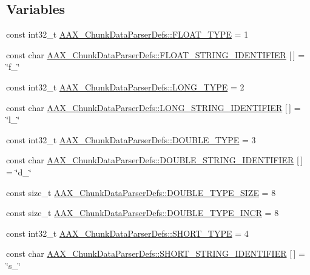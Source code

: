 \subsection*{Variables}
\begin{DoxyCompactItemize}
\item 
const int32\+\_\+t \mbox{\hyperlink{a00851_ad5dab97f040a4e216054bec18a3a3848}{A\+A\+X\+\_\+\+Chunk\+Data\+Parser\+Defs\+::\+F\+L\+O\+A\+T\+\_\+\+T\+Y\+PE}} = 1
\item 
const char \mbox{\hyperlink{a00851_a8340a22e9392091da5acf3bbbea18fc6}{A\+A\+X\+\_\+\+Chunk\+Data\+Parser\+Defs\+::\+F\+L\+O\+A\+T\+\_\+\+S\+T\+R\+I\+N\+G\+\_\+\+I\+D\+E\+N\+T\+I\+F\+I\+ER}} \mbox{[}$\,$\mbox{]} = \char`\"{}f\+\_\+\char`\"{}
\item 
const int32\+\_\+t \mbox{\hyperlink{a00851_a228099aae2d4442465b8d8ba67d832c7}{A\+A\+X\+\_\+\+Chunk\+Data\+Parser\+Defs\+::\+L\+O\+N\+G\+\_\+\+T\+Y\+PE}} = 2
\item 
const char \mbox{\hyperlink{a00851_af53f70a76b16ae3e06cd38515f3842e1}{A\+A\+X\+\_\+\+Chunk\+Data\+Parser\+Defs\+::\+L\+O\+N\+G\+\_\+\+S\+T\+R\+I\+N\+G\+\_\+\+I\+D\+E\+N\+T\+I\+F\+I\+ER}} \mbox{[}$\,$\mbox{]} = \char`\"{}l\+\_\+\char`\"{}
\item 
const int32\+\_\+t \mbox{\hyperlink{a00851_a4724cff14c9b5d97bf3304247c717763}{A\+A\+X\+\_\+\+Chunk\+Data\+Parser\+Defs\+::\+D\+O\+U\+B\+L\+E\+\_\+\+T\+Y\+PE}} = 3
\item 
const char \mbox{\hyperlink{a00851_a9875551b1fa5760f6b6d4525d62d7ccc}{A\+A\+X\+\_\+\+Chunk\+Data\+Parser\+Defs\+::\+D\+O\+U\+B\+L\+E\+\_\+\+S\+T\+R\+I\+N\+G\+\_\+\+I\+D\+E\+N\+T\+I\+F\+I\+ER}} \mbox{[}$\,$\mbox{]} = \char`\"{}d\+\_\+\char`\"{}
\item 
const size\+\_\+t \mbox{\hyperlink{a00851_a485cccfc704f0da8c1d25aa0ba5723ab}{A\+A\+X\+\_\+\+Chunk\+Data\+Parser\+Defs\+::\+D\+O\+U\+B\+L\+E\+\_\+\+T\+Y\+P\+E\+\_\+\+S\+I\+ZE}} = 8
\item 
const size\+\_\+t \mbox{\hyperlink{a00851_aaa27d90baca7ee4caaeab126c56ff76f}{A\+A\+X\+\_\+\+Chunk\+Data\+Parser\+Defs\+::\+D\+O\+U\+B\+L\+E\+\_\+\+T\+Y\+P\+E\+\_\+\+I\+N\+CR}} = 8
\item 
const int32\+\_\+t \mbox{\hyperlink{a00851_a4e1dca1df2ca60f4325cddbbc7556121}{A\+A\+X\+\_\+\+Chunk\+Data\+Parser\+Defs\+::\+S\+H\+O\+R\+T\+\_\+\+T\+Y\+PE}} = 4
\item 
const char \mbox{\hyperlink{a00851_a5d6864069bd1e6c2850bee584b6246c8}{A\+A\+X\+\_\+\+Chunk\+Data\+Parser\+Defs\+::\+S\+H\+O\+R\+T\+\_\+\+S\+T\+R\+I\+N\+G\+\_\+\+I\+D\+E\+N\+T\+I\+F\+I\+ER}} \mbox{[}$\,$\mbox{]} = \char`\"{}s\+\_\+\char`\"{}

\end{DoxyCompactItemize}
